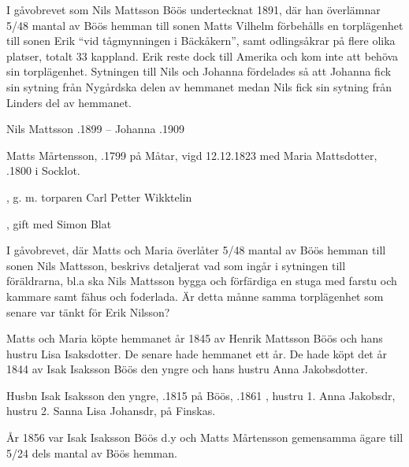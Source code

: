 I gåvobrevet som Nils Mattsson Böös undertecknat 1891, där han överlämnar 5/48 mantal av Böös hemman till sonen Matts Vilhelm förbehålls en torplägenhet till sonen Erik ``vid tågmynningen i Bäckåkern'', samt odlingsåkrar på flere olika platser, totalt 33 kappland. Erik reste dock till Amerika och kom inte att behöva sin torplägenhet. Sytningen till Nils och Johanna fördelades så att Johanna fick sin sytning från Nygårdska delen av hemmanet medan Nils fick sin sytning från Linders del av hemmanet.

Nils Mattsson .1899  --  Johanna .1909


Matts Mårtensson, .1799 på Måtar, vigd 12.12.1823 med  Maria Mattsdotter, .1800 i Socklot.
\begin{jhchildren}
  \item {}
  \item {}
  \item {}, g. m. torparen Carl Petter Wikktelin
  \item {}
  \item {}, gift med Simon Blat
  \item {}
\end{jhchildren}
I gåvobrevet, där Matts och Maria överlåter 5/48 mantal av Böös hemman till sonen Nils Mattsson, beskrivs detaljerat vad som ingår i sytningen till föräldrarna, bl.a ska Nils Mattsson bygga och förfärdiga en stuga med farstu och kammare samt fähus och foderlada. Är detta månne samma torplägenhet som senare var tänkt för Erik Nilsson?

Matts och Maria köpte hemmanet år 1845 av Henrik Mattsson Böös och hans hustru Lisa Isaksdotter. De senare hade hemmanet ett år. De hade köpt det år 1844 av Isak Isaksson Böös den yngre och hans hustru Anna Jakobsdotter.


Husbn Isak Isaksson den yngre, .1815 på Böös, .1861 , hustru 1. Anna Jakobsdr, hustru 2. Sanna Lisa Johansdr,  på Finskas.
\begin{jhchildren}
  \item {}
  \item {}
  \item {}
  \item {}
  \item {}
  \item {}
  \item {}
  \item {}
\end{jhchildren}
År 1856 var Isak Isaksson Böös d.y och Matts Mårtensson gemensamma ägare till 5/24 dels mantal av Böös hemman.



